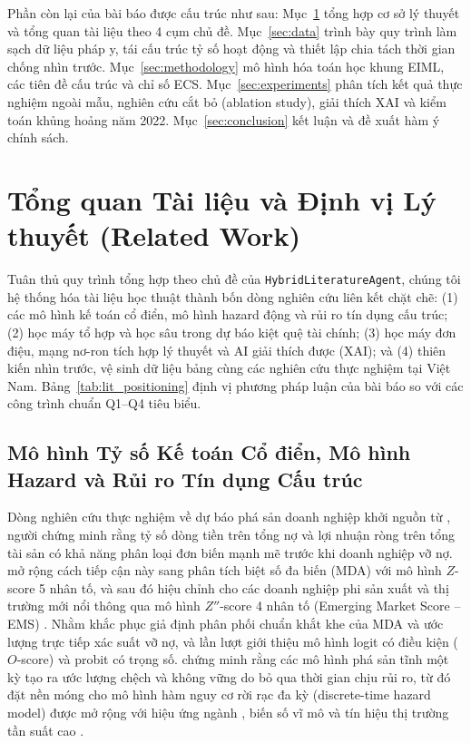 \documentclass[11pt,a4paper]{article}
\begin{document}
Phần còn lại của bài báo được cấu trúc như sau: Mục~\ref{sec:literature} tổng hợp cơ sở lý thuyết và tổng quan tài liệu theo 4 cụm chủ đề. Mục~\ref{sec:data} trình bày quy trình làm sạch dữ liệu pháp y, tái cấu trúc tỷ số hoạt động và thiết lập chia tách thời gian chống nhìn trước. Mục~\ref{sec:methodology} mô hình hóa toán học khung EIML, các tiên đề cấu trúc và chỉ số ECS. Mục~\ref{sec:experiments} phân tích kết quả thực nghiệm ngoài mẫu, nghiên cứu cắt bỏ (ablation study), giải thích XAI và kiểm toán khủng hoảng năm 2022. Mục~\ref{sec:conclusion} kết luận và đề xuất hàm ý chính sách.

\section{Tổng quan Tài liệu và Định vị Lý thuyết (Related Work)}
\label{sec:literature}

Tuân thủ quy trình tổng hợp theo chủ đề của \texttt{HybridLiteratureAgent}, chúng tôi hệ thống hóa tài liệu học thuật thành bốn dòng nghiên cứu liên kết chặt chẽ: (1) các mô hình kế toán cổ điển, mô hình hazard động và rủi ro tín dụng cấu trúc; (2) học máy tổ hợp và học sâu trong dự báo kiệt quệ tài chính; (3) học máy đơn điệu, mạng nơ-ron tích hợp lý thuyết và AI giải thích được (XAI); và (4) thiên kiến nhìn trước, vệ sinh dữ liệu bảng cùng các nghiên cứu thực nghiệm tại Việt Nam. Bảng~\ref{tab:lit_positioning} định vị phương pháp luận của bài báo so với các công trình chuẩn Q1--Q4 tiêu biểu.

\subsection{Mô hình Tỷ số Kế toán Cổ điển, Mô hình Hazard và Rủi ro Tín dụng Cấu trúc}
Dòng nghiên cứu thực nghiệm về dự báo phá sản doanh nghiệp khởi nguồn từ \citet{beaver1966financial}, người chứng minh rằng tỷ số dòng tiền trên tổng nợ và lợi nhuận ròng trên tổng tài sản có khả năng phân loại đơn biến mạnh mẽ trước khi doanh nghiệp vỡ nợ. \citet{altman1968financial} mở rộng cách tiếp cận này sang phân tích biệt số đa biến (MDA) với mô hình $Z$-score 5 nhân tố, và sau đó hiệu chỉnh cho các doanh nghiệp phi sản xuất và thị trường mới nổi thông qua mô hình $Z''$-score 4 nhân tố (Emerging Market Score -- EMS) \citep{altman1995emerging,altman2017financial}. Nhằm khắc phục giả định phân phối chuẩn khắt khe của MDA và ước lượng trực tiếp xác suất vỡ nợ, \citet{ohlson1980financial} và \citet{zmijewski1984methodological} lần lượt giới thiệu mô hình logit có điều kiện ($O$-score) và probit có trọng số. \citet{shumway2001forecasting} chứng minh rằng các mô hình phá sản tĩnh một kỳ tạo ra ước lượng chệch và không vững do bỏ qua thời gian chịu rủi ro, từ đó đặt nền móng cho mô hình hàm nguy cơ rời rạc đa kỳ (discrete-time hazard model) được mở rộng với hiệu ứng ngành \citep{chava2004bankruptcy}, biến số vĩ mô \citep{tinoco2013financial,bauer2014are} và tín hiệu thị trường tần suất cao \citep{campbell2008search}.
\end{document}
